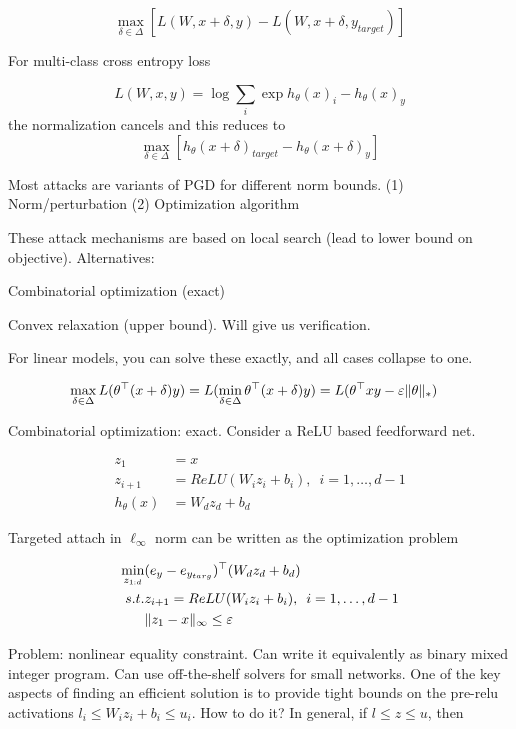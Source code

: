 \documentclass[english]{article}
\begin{document}
$$\max_{\delta\in \Delta}[
L(W,x+\delta,y)
- 
L(W,x+\delta,y_{target})]
$$

For multi-class cross entropy loss 

$$
L(W,x,y)
= 
\log\sum_i \exp h_{\theta}(x)_i- h_{\theta}(x)_y
$$
the normalization cancels and this reduces to
$$\max_{\delta\in \Delta}[
h_{\theta}(x+\delta)_{target}
- 
h_{\theta}(x+\delta)_y]
$$

Most attacks are variants of PGD for different norm bounds. (1) Norm/perturbation (2) Optimization algorithm


\item These attack mechanisms are based on local search (lead to lower bound on objective). Alternatives: 

Combinatorial optimization (exact)

Convex relaxation (upper bound). Will give us verification. 

For linear models, you can solve these exactly, and all cases collapse to one. 


\begin{align*}
&\max_{\delta\in\Delta} L(\theta^\top(x+\delta)y) =
L(\min_{\delta\in\Delta}\theta^\top(x+\delta)y)= 
L(\theta^\top xy-\varepsilon \|\theta\|_*)
\end{align*}

\item Combinatorial optimization: exact. Consider a ReLU based feedforward net. 

\begin{align*}
z_1&=x\\
z_{i+1} &= ReLU(W_iz_i+b_i),\,\,\,i=1,\ldots,d-1\\
h_\theta(x)&=W_dz_d+b_d
\end{align*}

Targeted attach in $\ell_\infty$ norm can be written as the optimization problem

\begin{align*}
\min_{z_{1:d}}& (e_y-e_{y_{targ}})^\top (W_d z_d + b_d)\\
s.t.& z_{i+1}= ReLU(W_iz_i+b_i),\,\,\,i=1,\ldots,d-1\\
&\|z_1-x\|_\infty\le \varepsilon
\end{align*}

Problem: nonlinear equality constraint. Can write it equivalently as binary mixed integer program. Can use off-the-shelf solvers for small networks. One of the key aspects of finding an efficient solution is to provide tight bounds on the pre-relu activations $l_i \le W_iz_i+b_i \le u_i$. How to do it?  In general, if $l\le z\le u$, then 
\end{document}
